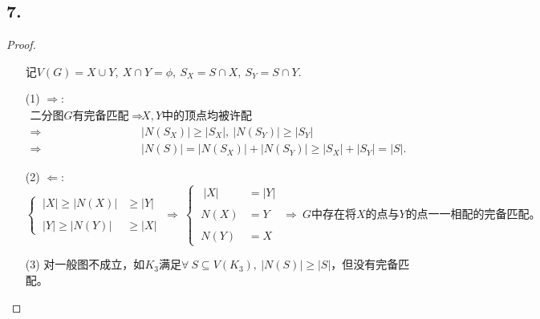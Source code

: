 \documentclass{article}
\begin{document}
\subsection*{7.}
\begin{proof}
    \begin{enumerate}
        \item []记$V(G)=X\cup Y,\ X\cap Y=\phi,\ S_X=S\cap X,\ S_Y=S\cap Y$.
        \item [(1)]$\Rightarrow$:
        \begin{align*}
            \mbox{二分图}G \mbox{有完备匹配}
            \Rightarrow\ 
            &X,Y\mbox{中的顶点均被许配}\\
            \Rightarrow\ 
            &|N(S_X)|\geq |S_X|,\ |N(S_Y)|\geq |S_Y|\\
            \Rightarrow\ 
            &|N(S)|=|N(S_X)|+|N(S_Y)|\geq |S_X|+ |S_Y|=|S|.
        \end{align*}
        \item [(2)]$\Leftarrow$:
        \[
            \begin{cases}
                \ |X|\geq |N(X)|&\geq |Y|\\
                \\
                \ |Y|\geq |N(Y)|&\geq |X|
            \end{cases}
            \ \Rightarrow\ 
            \begin{cases}
                \ \ |X| &=|Y|\\
                \\
                \ N(X) &=Y \\
                \\
                \ N(Y) &=X 
            \end{cases}
            \ \Rightarrow\ 
            G\mbox{中存在将$X$的点与$Y$的点一一相配的完备匹配。}
        \]
        \item [(3)]对一般图不成立，如$K_3$满足$\forall\ S\subseteq V(K_3),\ |N(S)|\geq |S|$，但没有完备匹配。
    \end{enumerate}
\end{proof}
\end{document}
